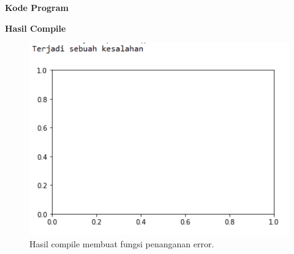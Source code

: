 \hfill \break
\textbf{Kode Program}



\hfill \break
\textbf{Hasil Compile}

\begin{figure}[H]
	\includegraphics[width=12cm]{figures/6/Praktek/1174038/error.png}
	\centering
	\caption{Hasil compile membuat fungsi penanganan error.}
\end{figure}

